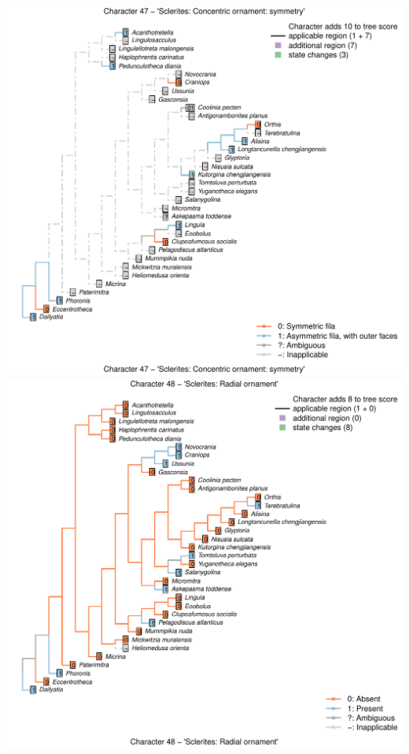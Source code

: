 \documentclass[]{book}
\theoremstyle{definition}
\theoremstyle{definition}
\theoremstyle{definition}
\theoremstyle{remark}
\begin{document}
\includegraphics{Brachiopod_phylogeny_files/figure-latex/unnamed-chunk-4-47.pdf}
\includegraphics{Brachiopod_phylogeny_files/figure-latex/unnamed-chunk-4-48.pdf}
\end{document}
